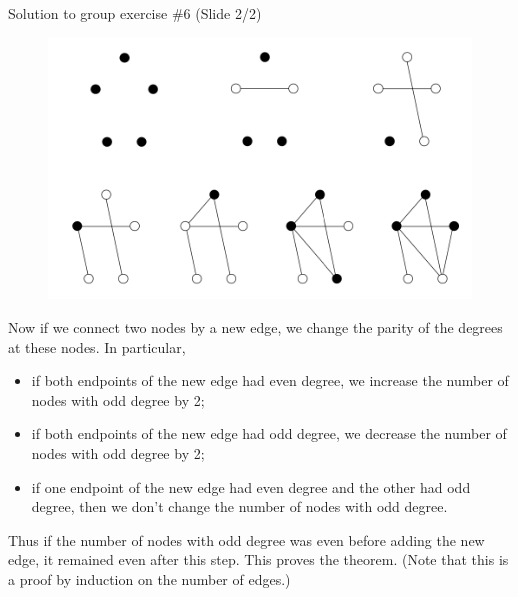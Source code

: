 \documentclass[10pt]{beamer}
\begin{document}
\begin{frame}{Solution to group exercise \#6 (Slide 2/2)} 
\footnotesize 

\begin{figure}
\includegraphics[width=.4\linewidth]{images/number_of_nodes_with_odd_degree_is_even.png}	
\end{figure}

\vspace{-.2cm}

Now if we connect two nodes by a new edge, we change the parity of the degrees at these nodes. In particular,
\begin{itemize}
\item if both endpoints of the new edge had even degree, we increase the number of nodes with odd degree by 2;
\item if both endpoints of the new edge had odd degree, we decrease the number of nodes with odd degree by 2;
\item if one endpoint of the new edge had even degree and the other had odd degree, then we don’t change the number of nodes with odd degree.
\end{itemize}

Thus if the number of nodes with odd degree was even before adding the new edge, it remained even after this step. This proves the theorem. (Note that this is a proof by induction on the number of edges.)

\end{frame}
\end{document}
